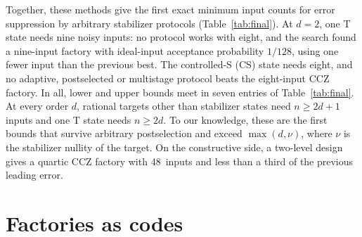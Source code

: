 \documentclass[aps,prl,reprint,twocolumn,amsmath,amssymb,floatfix,nofootinbib,superscriptaddress]{revtex4-2}
\newcommand{\QuarticUB}{48}
\begin{document}
Together, these methods give the first exact minimum input counts for error suppression by arbitrary stabilizer protocols (Table~\ref{tab:final}). At $d=2$, one T state needs nine noisy inputs: no protocol works with eight, and the search found a nine-input factory with ideal-input acceptance probability $1/128$, using one fewer input than the previous best. The controlled-S (CS) state needs eight, and no adaptive, postselected or multistage protocol beats the eight-input CCZ factory. In all, lower and upper bounds meet in seven entries of Table~\ref{tab:final}. At every order $d$, rational targets other than stabilizer states need $n\geq2d+1$ inputs and one T state needs $n\geq2d$. To our knowledge, these are the first bounds that survive arbitrary postselection and exceed $\max(d,\nu)$, where $\nu$ is the stabilizer nullity of the target. On the constructive side, a two-level design gives a quartic CCZ factory with \QuarticUB\ inputs and less than a third of the previous leading error.

%
\section{Factories as codes}\label{sec:framework}
\end{document}
